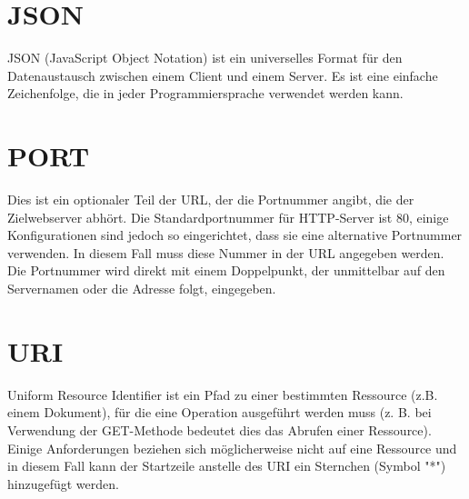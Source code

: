 \section*{JSON}
\label{sec:appendix:json}
JSON (JavaScript Object Notation) ist ein universelles Format für den Datenaustausch zwischen einem Client und einem Server. Es ist eine einfache Zeichenfolge, die in jeder Programmiersprache verwendet werden kann.

\section*{PORT} 
\label{sec:appendix:port}
Dies ist ein optionaler Teil der URL, der die Portnummer angibt, die der Zielwebserver abhört. Die Standardportnummer für HTTP-Server ist 80, einige Konfigurationen sind jedoch so eingerichtet, dass sie eine alternative Portnummer verwenden. In diesem Fall muss diese Nummer in der URL angegeben werden. Die Portnummer wird direkt mit einem Doppelpunkt, der unmittelbar auf den Servernamen oder die Adresse folgt, eingegeben.

\section*{URI}
\label{sec:appendix:uri}
Uniform Resource Identifier ist ein Pfad zu einer bestimmten Ressource (z.B.  einem Dokument), für die eine Operation ausgeführt werden muss (z. B. bei Verwendung der GET-Methode bedeutet dies das Abrufen einer Ressource). Einige Anforderungen beziehen sich möglicherweise nicht auf eine Ressource und in diesem Fall kann der Startzeile anstelle des URI ein Sternchen (Symbol "*") hinzugefügt werden.


 